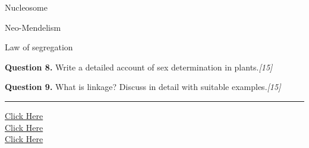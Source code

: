 \documentclass[11pt,a4paper]{article}
\newcommand{\pts}[1]{\hfill   \textit{[#1]}}
\begin{document}
\begin{parts}
  \item Nucleosome
  \item Neo-Mendelism
  \item Law of segregation
\end{parts}

\medskip


\noindent   \textbf{Question 8.} Write a detailed account of sex determination in plants.\pts{15}

\medskip


\noindent   \textbf{Question 9.} What is linkage? Discuss in detail with suitable examples.\pts{15}

\vfill
\rule{\linewidth}{0.4pt}

\begin{center}\small
\href{https://bhu-exam.vercel.app/}{Click Here}\\[4pt]\href{https://me-aryan.vercel.app/}{Click Here}\\[4pt]\href{https://quashan-me.vercel.app/}{Click Here}
\end{center}
\end{document}
